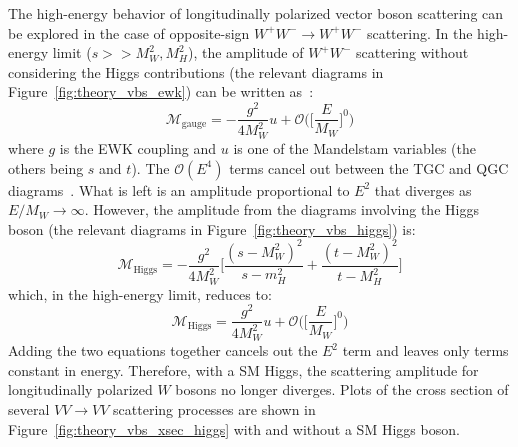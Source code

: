 The high-energy behavior of longitudinally polarized vector boson scattering can be explored in the case of opposite-sign $W^{+}W^{-}\rightarrow W^{+}W^{-}$ scattering.
In the high-energy limit ($s >> M_W^2, M_H^2$), the amplitude of $W^{+}W^{-}$ scattering without considering the Higgs contributions (the relevant diagrams in Figure~\ref{fig:theory_vbs_ewk}) can be written as~\cite{2009.strong-gauge-boson-scattering}:
\begin{equation}
  \mathcal{M}_{\textrm{gauge}} = -\frac{g^2}{4M_W^2}u+\mathcal{O}\Bigg(\bigg[\frac{E}{M_W}\bigg]^0\Bigg)
  \label{eq:theory_longitudinal_m_gauge}
\end{equation}
where $g$ is the EWK coupling and $u$ is one of the Mandelstam variables (the others being $s$ and $t$).
The $\mathcal{O}(E^4)$ terms cancel out between the TGC and QGC diagrams~\cite{2012.vbs-thesis-oord}.
What is left is an amplitude proportional to $E^2$ that diverges as $E/M_W\rightarrow\infty$.
However, the amplitude from the diagrams involving the Higgs boson (the relevant diagrams in Figure~\ref{fig:theory_vbs_higgs}) is:
\begin{equation}
  \mathcal{M}_{\textrm{Higgs}} = -\frac{g^2}{4M_W^2}\bigg[\frac{(s-M_W^2)^2}{s-m_H^2}+\frac{(t-M_W^2)^2}{t-M_H^2}\bigg]
\end{equation}
which, in the high-energy limit, reduces to:
\begin{equation}
  \mathcal{M}_{\textrm{Higgs}} = \frac{g^2}{4M_W^2}u+\mathcal{O}\Bigg(\bigg[\frac{E}{M_W}\bigg]^0\Bigg)
  \label{eq:theory_longitudinal_m_higgs}
\end{equation}
Adding the two equations together cancels out the $E^2$ term and leaves only terms constant in energy.
Therefore, with a SM Higgs, the scattering amplitude for longitudinally polarized $W$ bosons no longer diverges.
Plots of the cross section of several $VV\rightarrow VV$ scattering processes are shown in Figure~\ref{fig:theory_vbs_xsec_higgs} with and without a SM Higgs boson.

